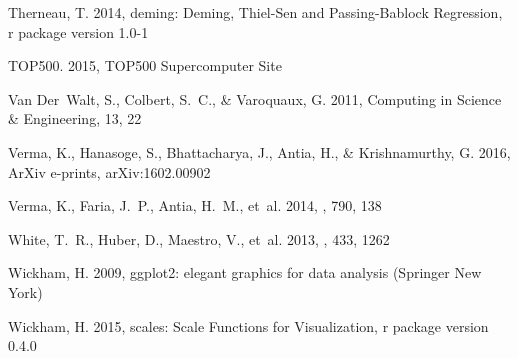 \documentclass[manuscript,linenumbers]{aastex6}
\begin{document}
\begin{thebibliography}{}
Therneau, T. 2014, deming: Deming, Thiel-Sen and Passing-Bablock Regression, r
  package version 1.0-1

TOP500. 2015, TOP500 Supercomputer Site

Van Der~Walt, S., Colbert, S.~C., \& Varoquaux, G. 2011, Computing in Science
  \& Engineering, 13, 22

{Verma}, K., {Hanasoge}, S., {Bhattacharya}, J., {Antia}, H., \&
  {Krishnamurthy}, G. 2016, ArXiv e-prints, arXiv:1602.00902

{Verma}, K., {Faria}, J.~P., {Antia}, H.~M., {et~al.} 2014, \apj, 790, 138

{White}, T.~R., {Huber}, D., {Maestro}, V., {et~al.} 2013, \mnras, 433, 1262

Wickham, H. 2009, ggplot2: elegant graphics for data analysis (Springer New
  York)

Wickham, H. 2015, scales: Scale Functions for Visualization, r package version 0.4.0

\end{thebibliography}
\end{document}
